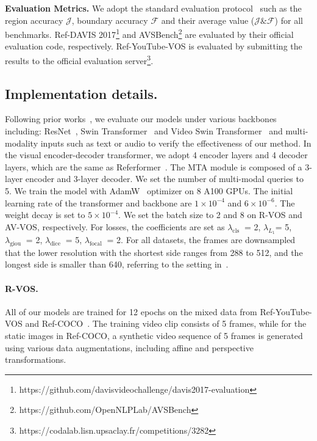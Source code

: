 \documentclass{article}
\begin{document}
\textbf{Evaluation Metrics.} We adopt the standard evaluation protocol~\cite{perazzi2016benchmark,pont20172017} such as the region accuracy $\mathcal{J}$,  boundary accuracy  $\mathcal{F}$ and their average value ($\mathcal{J}\&\mathcal{F}$) for all benchmarks.
Ref-DAVIS 2017\footnote{https://github.com/davisvideochallenge/davis2017-evaluation} and AVSBench\footnote{https://github.com/OpenNLPLab/AVSBench} are evaluated by their official evaluation code, respectively. Ref-YouTube-VOS is evaluated by submitting the results to the official evaluation server\footnote{https://codalab.lisn.upsaclay.fr/competitions/3282}.

\subsection{Implementation details.}\label{implementation}
Following prior works~\cite{wu2022language}, we evaluate our models under various backbones including: ResNet~\cite{he2016deep}, Swin Transformer~\cite{liu2021swin} and Video Swin Transformer~\cite{liu2022video} and multi-modality inputs such as text or audio to verify the effectiveness of our method. In the visual encoder-decoder transformer, we adopt 4 encoder layers and 4 decoder layers, which are the same as Referformer~\cite{wu2022language}. The MTA module is composed of a 3-layer encoder and 3-layer decoder. 
We set the number of multi-modal queries to 5.
We train the model with AdamW~\cite{loshchilov2017decoupled} optimizer on 8 A100 GPUs.
The initial learning rate of the transformer and backbone are $1 \times 10^{-4}$ and $6 \times 10^{-6}$. The weight decay is set to $5 \times 10^{-4}$.
We set the batch size to 2 and 8 on R-VOS and AV-VOS, respectively. For losses, the coefficients are set as $\lambda_{\text {cls }}$ = 2, $\lambda_{L_1}$= 5, $\lambda_{\text {giou }}$ = 2, $\lambda_{\text {dice }}$ = 5, $\lambda_{\text {focal }}$ = 2. For all datasets, the frames are downsampled that the lower resolution with the shortest side ranges from 288 to 512, and the longest side is smaller than 640, referring to the setting in~\cite{wu2022language}.


\paragraph{R-VOS.} All of our models are trained for 12 epochs on the mixed data from Ref-YouTube-VOS and Ref-COCO~\cite{yu2016modeling}. The training video clip consists of 5 frames, while for the static images in Ref-COCO, a synthetic video sequence of 5 frames is generated using various data augmentations, including affine and perspective transformations.
\end{document}
